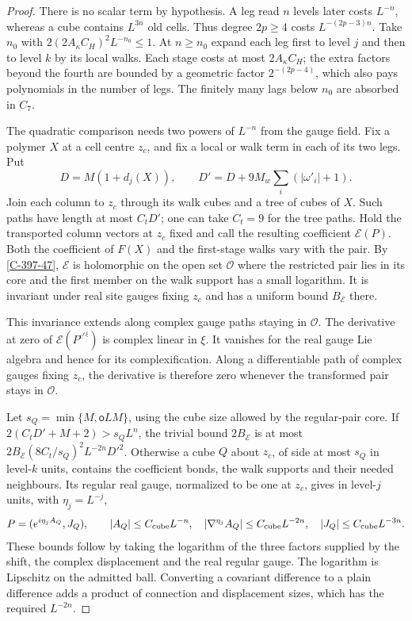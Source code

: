 \documentclass[11pt,letterpaper,reqno]{amsart}
\theoremstyle{definition}
\theoremstyle{remark}
\begin{document}
\begin{proof}
There is no scalar term by hypothesis. A leg read $n$ levels
later costs $L^{-n}$, whereas a cube
contains $L^{3n}$ old cells.  Thus degree $2p\ge4$ costs
$L^{-(2p-3)n}$.  Take $n_0$ with
$2(2A_\kappa C_H)^2L^{-n_0}\le1$.  At $n\ge n_0$ expand
each leg first to level $j$ and then to level $k$ by its local
walks.  Each stage costs at most $2A_\kappa C_H$; the extra
factors beyond the fourth are bounded by a geometric factor
$2^{-(2p-4)}$, which also pays polynomials in the number of
legs.  The finitely many lags below $n_0$ are absorbed in $C_7$.

The quadratic comparison needs two powers of $L^{-n}$ from
the gauge field.  Fix a polymer $X$ at a cell centre $z_c$,
and fix a local or walk term in each of its two legs.  Put
\[
 D=M(1+d_j(X)),\qquad
 D'=D+9M_w\sum_i(|\omega'_i|+1).
\]
Join each column to $z_c$ through its walk cubes and a tree
of cubes of $X$.  Such paths have length at most $C_tD'$;
one can take $C_t=9$ for the tree paths.  Hold the transported
column vectors at $z_c$ fixed and call the resulting
coefficient $\mathcal E(P)$.  Both the coefficient of $F(X)$
and the first-stage walks vary with the pair.  By
\cref{C-397-47}, $\mathcal E$ is holomorphic on the open
set $\mathcal O$ where the restricted pair lies in its
core and the first member on the walk support has a small
logarithm.  It is invariant under real site gauges fixing
$z_c$ and has a uniform bound $B_{\mathcal E}$ there.

This invariance extends along complex gauge paths staying
in $\mathcal O$.  The derivative at zero of
$\mathcal E(P^{e^{\epsilon\xi}})$ is complex linear in
$\xi$.  It vanishes for the real gauge Lie algebra and
hence for its complexification.  Along a differentiable
path of complex gauges fixing $z_c$, the derivative is
therefore zero whenever the transformed pair stays in
$\mathcal O$.

Let $s_Q=\min\{M,\mathsf oLM\}$, using the cube size allowed
by the regular-pair core.  If
$2(C_tD'+M+2)>s_QL^n$, the trivial bound $2B_{\mathcal E}$
is at most
$2B_{\mathcal E}(8C_t/s_Q)^2L^{-2n}D'^2$.
Otherwise a cube $Q$ about $z_c$, of side at most $s_Q$
in level-$k$ units, contains the coefficient bonds, the
walk supports and their needed neighbours.  Its regular
real gauge, normalized to be one at $z_c$, gives in
level-$j$ units, with $\eta_j=L^{-j}$,
\[
 P=(e^{i\eta_j A_Q},J_Q),\qquad
 |A_Q|\le C_{\rm cube}L^{-n},\quad
 |\nabla^{\eta_j}A_Q|\le C_{\rm cube}L^{-2n},\quad
 |J_Q|\le C_{\rm cube}L^{-3n}.
\]
These bounds follow by taking the logarithm of the three
factors supplied by the shift, the complex displacement
and the real regular gauge.  The logarithm is Lipschitz
on the admitted ball.  Converting a covariant difference
to a plain difference adds a product of connection and
displacement sizes, which has the required $L^{-2n}$.


\end{proof}
\end{document}
